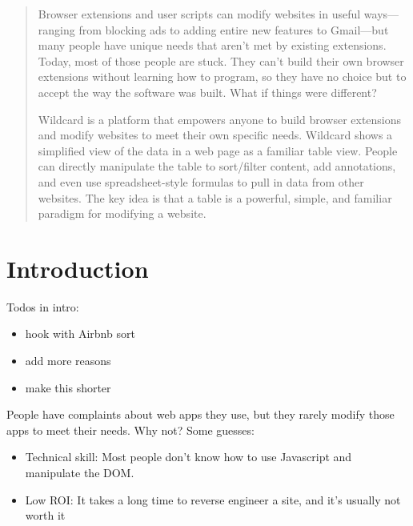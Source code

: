 \documentclass[english,submission]{programming}
\providecommand{\tightlist}{%
  \setlength{\itemsep}{0pt}\setlength{\parskip}{0pt}}
\begin{document}
\begin{abstract}
Browser extensions and user scripts can modify websites in useful
ways---ranging from blocking ads to adding entire new features to
Gmail---but many people have unique needs that aren't met by existing
extensions. Today, most of those people are stuck. They can't build
their own browser extensions without learning how to program, so they
have no choice but to accept the way the software was built. What if
things were different?

Wildcard is a platform that empowers anyone to build browser extensions
and modify websites to meet their own specific needs. Wildcard shows a
simplified view of the data in a web page as a familiar table view.
People can directly manipulate the table to sort/filter content, add
annotations, and even use spreadsheet-style formulas to pull in data
from other websites. The key idea is that a table is a powerful, simple,
and familiar paradigm for modifying a website.
\end{abstract}


\hypertarget{introduction}{%
\section{Introduction}\label{introduction}}

Todos in intro:

\begin{itemize}
\tightlist
\item
  hook with Airbnb sort
\item
  add more reasons
\item
  make this shorter
\end{itemize}

People have complaints about web apps they use, but they rarely modify
those apps to meet their needs. Why not? Some guesses:

\begin{itemize}
\tightlist
\item
  Technical skill: Most people don't know how to use Javascript and
  manipulate the DOM.
\item
  Low ROI: It takes a long time to reverse engineer a site, and it's
  usually not worth it
\end{itemize}
\end{document}
